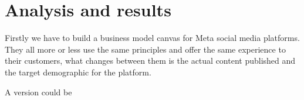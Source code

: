 \section{Analysis and results}
Firstly we have to build a business model canvas for Meta social media
platforms. They all more or less use the same principles and offer the
same experience to their customers, what changes between them is the
actual content published and the target demographic for the platform.

A version could be



